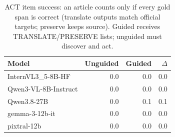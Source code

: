 \begin{table}[t]\centering\small
\caption{ACT item success: an article counts only if every gold span is correct (translate outputs match official targets; preserve keeps source). Guided receives TRANSLATE/PRESERVE lists; unguided must discover and act.}
\label{tab:news-act-item}
\begin{tabular}{l r r r}\toprule
Model & Unguided & Guided & $\Delta$ \\
\midrule
InternVL3_5-8B-HF & 0.0 & 0.0 & 0.0 \\
Qwen3-VL-8B-Instruct & 0.0 & 0.0 & 0.0 \\
Qwen3.8-27B & 0.0 & 0.1 & 0.1 \\
gemma-3-12b-it & 0.0 & 0.0 & 0.0 \\
pixtral-12b & 0.0 & 0.0 & 0.0 \\
\bottomrule\end{tabular}\end{table}
